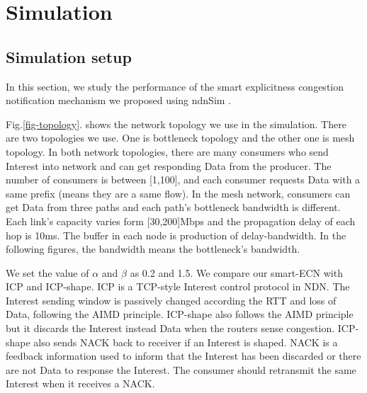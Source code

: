 
\section{Simulation}
\subsection{Simulation setup}
In this section, we study the performance of the smart explicitness congestion notification mechanism we proposed using ndnSim\cite{ndnsimnet} \cite{ndnsim}.

Fig.\ref{fig-topology}. shows the network topology we use in the simulation. There are two topologies we use. One is bottleneck topology and the other one is mesh topology. In both network topologies, there are many consumers who send Interest into network and can get responding Data from the producer. The number of consumers is between [1,100], and each consumer requests Data with a same prefix (means they are a same flow). In the mesh network, consumers can get Data from three paths and each path's bottleneck bandwidth is different. Each link's capacity varies form [30,200]Mbps and the propagation delay of each hop is 10ms. The buffer in each node is production of delay-bandwidth. In the following figures, the bandwidth means the bottleneck's bandwidth.

We set the value of $\alpha$ and $\beta$ as 0.2 and 1.5. We compare our smart-ECN with ICP and ICP-shape. ICP is a TCP-style Interest control protocol in NDN. The Interest sending window is passively changed according the RTT and loss of Data, following the AIMD principle\cite{ICP}. ICP-shape also follows the AIMD principle but it discards the Interest instead Data when the routers sense congestion\cite{improveshape}. ICP-shape also sends NACK back to receiver if an Interest is shaped. NACK is a feedback information used to inform that the Interest has been discarded or there are not Data to response the Interest. The consumer should retransmit the same Interest when it receives a NACK.

